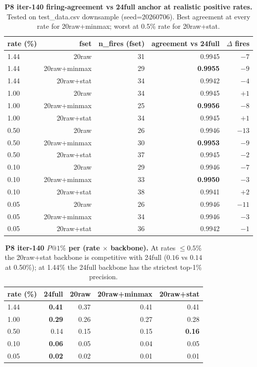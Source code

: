 \begin{table}[h]
\centering
\caption{\textbf{P8 iter-140 firing-agreement vs 24full anchor at
realistic positive rates.}  Tested on test\_data.csv
downsample (seed=20260706).  Best agreement at every rate for
20raw+minmax; worst at 0.5\% rate for 20raw+stat.}
\label{tab:p8-iter140-firing-agreement}
\small
\begin{tabular}{lrrrr}
\toprule
rate (\%) & fset & n\_fires (fset) & agreement vs 24full & $\Delta$ fires \\
\midrule
1.44 & 20raw & 31 & 0.9945 & $-7$ \\
1.44 & 20raw+minmax & 29 & \textbf{0.9955} & $-9$ \\
1.44 & 20raw+stat  & 34 & 0.9942 & $-4$ \\
1.00 & 20raw & 34 & 0.9945 & $+1$ \\
1.00 & 20raw+minmax & 25 & \textbf{0.9956} & $-8$ \\
1.00 & 20raw+stat  & 34 & 0.9945 & $+1$ \\
0.50 & 20raw & 26 & 0.9946 & $-13$ \\
0.50 & 20raw+minmax & 30 & \textbf{0.9953} & $-9$ \\
0.50 & 20raw+stat  & 37 & 0.9945 & $-2$ \\
0.10 & 20raw & 29 & 0.9946 & $-7$ \\
0.10 & 20raw+minmax & 33 & \textbf{0.9950} & $-3$ \\
0.10 & 20raw+stat  & 38 & 0.9941 & $+2$ \\
0.05 & 20raw & 26 & 0.9946 & $-11$ \\
0.05 & 20raw+minmax & 34 & 0.9946 & $-3$ \\
0.05 & 20raw+stat  & 36 & 0.9942 & $-1$ \\
\bottomrule
\end{tabular}
\end{table}

\begin{table}[h]
\centering
\caption{\textbf{P8 iter-140 $P@1\%$ per (rate $\times$ backbone).}
At rates $\le 0.5\%$ the 20raw+stat backbone is competitive with
24full ($0.16$ vs $0.14$ at 0.50\%); at 1.44\% the 24full backbone
has the strictest top-1\% precision.}
\label{tab:p8-iter140-p-at-1}
\small
\begin{tabular}{lrrrr}
\toprule
rate (\%) & 24full & 20raw & 20raw+minmax & 20raw+stat \\
\midrule
1.44 & \textbf{0.41} & 0.37 & 0.41 & 0.41 \\
1.00 & \textbf{0.29} & 0.26 & 0.27 & 0.28 \\
0.50 & 0.14 & 0.15 & 0.15 & \textbf{0.16} \\
0.10 & \textbf{0.06} & 0.05 & 0.04 & 0.05 \\
0.05 & \textbf{0.02} & 0.02 & 0.01 & 0.01 \\
\bottomrule
\end{tabular}
\end{table}

